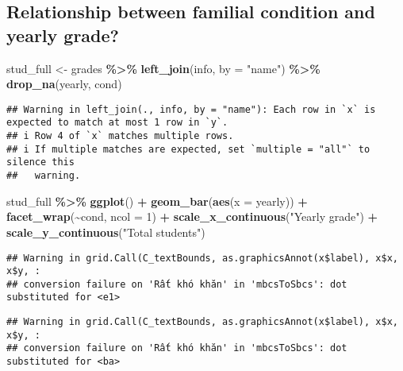 \documentclass[
]{article}
\newenvironment{Shaded}{\begin{snugshade}}{\end{snugshade}}
\newcommand{\AttributeTok}[1]{\textcolor[rgb]{0.13,0.29,0.53}{#1}}
\newcommand{\DecValTok}[1]{\textcolor[rgb]{0.00,0.00,0.81}{#1}}
\newcommand{\FunctionTok}[1]{\textcolor[rgb]{0.13,0.29,0.53}{\textbf{#1}}}
\newcommand{\NormalTok}[1]{#1}
\newcommand{\OtherTok}[1]{\textcolor[rgb]{0.56,0.35,0.01}{#1}}
\newcommand{\SpecialCharTok}[1]{\textcolor[rgb]{0.81,0.36,0.00}{\textbf{#1}}}
\newcommand{\StringTok}[1]{\textcolor[rgb]{0.31,0.60,0.02}{#1}}
\begin{document}
\hypertarget{relationship-between-familial-condition-and-yearly-grade}{%
\subsection{Relationship between familial condition and yearly
grade?}\label{relationship-between-familial-condition-and-yearly-grade}}

\begin{Shaded}
\begin{Highlighting}[]
\NormalTok{stud\_full }\OtherTok{\textless{}{-}}\NormalTok{ grades }\SpecialCharTok{\%\textgreater{}\%} 
  \FunctionTok{left\_join}\NormalTok{(info, }\AttributeTok{by =} \StringTok{"name"}\NormalTok{) }\SpecialCharTok{\%\textgreater{}\%} 
  \FunctionTok{drop\_na}\NormalTok{(yearly, cond) }
\end{Highlighting}
\end{Shaded}

\begin{verbatim}
## Warning in left_join(., info, by = "name"): Each row in `x` is expected to match at most 1 row in `y`.
## i Row 4 of `x` matches multiple rows.
## i If multiple matches are expected, set `multiple = "all"` to silence this
##   warning.
\end{verbatim}

\begin{Shaded}
\begin{Highlighting}[]
\NormalTok{stud\_full }\SpecialCharTok{\%\textgreater{}\%}
  \FunctionTok{ggplot}\NormalTok{() }\SpecialCharTok{+} 
  \FunctionTok{geom\_bar}\NormalTok{(}\FunctionTok{aes}\NormalTok{(}\AttributeTok{x =}\NormalTok{ yearly)) }\SpecialCharTok{+} 
  \FunctionTok{facet\_wrap}\NormalTok{(}\SpecialCharTok{\textasciitilde{}}\NormalTok{cond, }\AttributeTok{ncol =} \DecValTok{1}\NormalTok{) }\SpecialCharTok{+} 
  \FunctionTok{scale\_x\_continuous}\NormalTok{(}\StringTok{"Yearly grade"}\NormalTok{) }\SpecialCharTok{+} 
  \FunctionTok{scale\_y\_continuous}\NormalTok{(}\StringTok{"Total students"}\NormalTok{)}
\end{Highlighting}
\end{Shaded}

\begin{verbatim}
## Warning in grid.Call(C_textBounds, as.graphicsAnnot(x$label), x$x, x$y, :
## conversion failure on 'Rất khó khăn' in 'mbcsToSbcs': dot substituted for <e1>
\end{verbatim}

\begin{verbatim}
## Warning in grid.Call(C_textBounds, as.graphicsAnnot(x$label), x$x, x$y, :
## conversion failure on 'Rất khó khăn' in 'mbcsToSbcs': dot substituted for <ba>
\end{verbatim}
\end{document}

